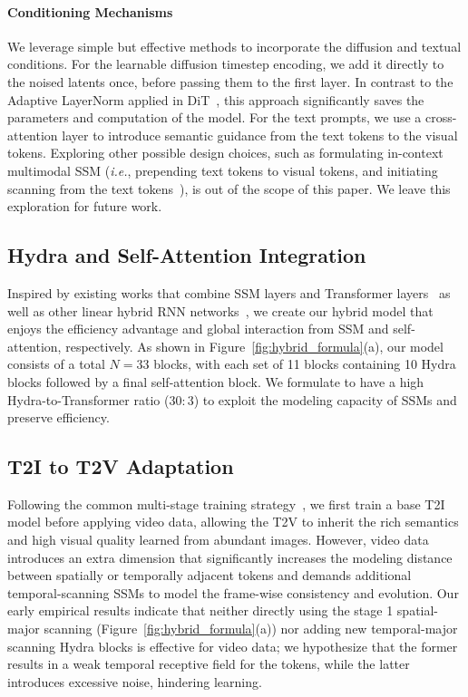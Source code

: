 \paragraph{Conditioning Mechanisms}
We leverage simple but effective methods to incorporate the diffusion and textual conditions. For the learnable diffusion timestep encoding, we add it directly to the noised latents once, before passing them to the first \ours{} layer. In contrast to the Adaptive LayerNorm applied in DiT~\citep{peebles2023dit}, this approach significantly saves the parameters and computation of the model. For the text prompts, we use a cross-attention layer to introduce semantic guidance from the text tokens to the visual tokens. Exploring other possible design choices, such as formulating in-context multimodal SSM (\textit{i.e.}, prepending text tokens to visual tokens, and initiating scanning from the text tokens~\citep{hu2024zigma}), is out of the scope of this paper. We leave this exploration for future work.

\subsection{Hydra and Self-Attention Integration}
\label{subsec:integration}
Inspired by existing works that combine SSM layers and Transformer layers~\citep{zuo2022augmented,waleffe2024empirical,lieber2024jamba,fei2024dimba,ziwen2024longlrm,wang2024mambainllama} as well as other linear hybrid RNN networks~\citep{botev2024recurrentgemma,de2024griffin}, we create our hybrid model that enjoys the efficiency advantage and global interaction from SSM and self-attention, respectively. As shown in Figure~\ref{fig:hybrid_formula}(a), our \ours{} model consists of a total $N{=}33$ blocks, with each set of 11 blocks containing 10 Hydra blocks followed by a final self-attention block. We formulate \ours{} to have a high Hydra-to-Transformer ratio ($30{:}3$) to exploit the modeling capacity of SSMs and preserve efficiency.


\subsection{T2I to T2V Adaptation}
\label{subsec:adapt}
Following the common multi-stage training strategy~\citep{hong2022cogvideo,blattmann2023align,girdhar2023emuvid,bar2024lumiere}, we first train a base T2I model before applying video data, allowing the T2V \ours{} to inherit the rich semantics and high visual quality learned from abundant images. However, video data introduces an extra dimension that significantly increases the modeling distance between spatially or temporally adjacent tokens and demands additional temporal-scanning SSMs to model the frame-wise consistency and evolution. Our early empirical results indicate that neither directly using the stage 1 spatial-major scanning (Figure~\ref{fig:hybrid_formula}(a)) nor adding new temporal-major scanning Hydra blocks is effective for video data; we hypothesize that the former results in a weak temporal receptive field for the tokens, while the latter introduces excessive noise, hindering learning. 

